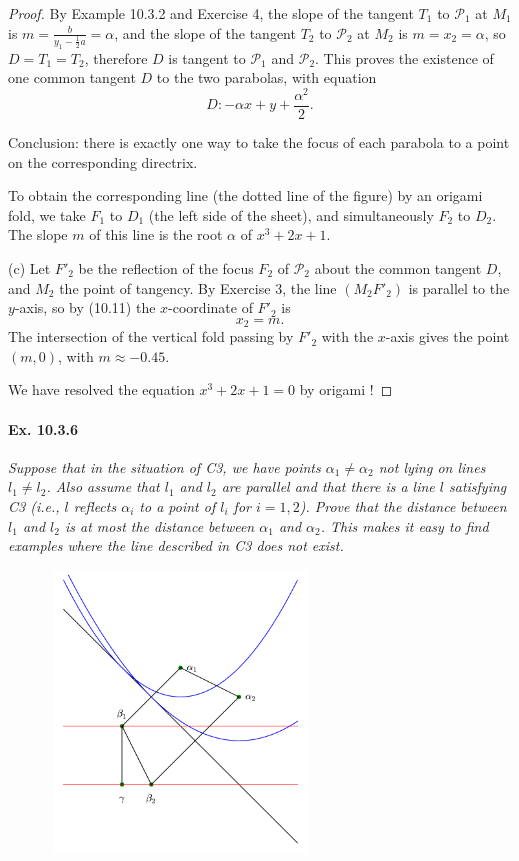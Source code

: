 \documentclass[11pt,a4paper]{article}
\begin{document}
\begin{proof}
By Example 10.3.2 and Exercise 4, the slope of the tangent $T_1$ to ${\mathscr P} _1$ at $M_1$ is $m = \frac{b}{y_1-\frac{1}{2}a} = \alpha$, and the slope of the tangent $T_2$ to ${\mathscr P} _2$ at $M_2$ is $m = x_2 = \alpha$, so $D = T_1 = T_2$, therefore $D$ is tangent to ${\mathscr P} _1$ and ${\mathscr P} _2$. This proves the existence of one common tangent $D$ to the two parabolas, with equation
$$D : -\alpha x + y +\frac{\alpha^2}{2}.$$

Conclusion: there is exactly one way to take the focus of each parabola to a point on the corresponding directrix.

To obtain the corresponding line (the dotted line of the figure) by an origami fold, we take $F_1$ to $D_1$ (the left side of the sheet), and simultaneously $F_2$ to $D_2$. The slope $m$ of this line is the root $\alpha$ of $x^3 + 2x +1$.


\item[(c)] Let $F'_2$ be the reflection of the focus $F_2$ of ${\mathscr P} _2$ about the common tangent $D$, and $M_2$ the point of tangency. By Exercise 3, the line $(M_2F'_2)$ is parallel to the $y$-axis, so by (10.11) the $x$-coordinate of $F'_2$ is $$x_2 =m.$$
 The intersection of the vertical fold  passing by $F'_2$ with the $x$-axis gives the point $(m,0)$, with $m\approx -0.45$. 
 
 We have resolved the equation $x^3 + 2x + 1 = 0$ by origami !
 
\end{proof}

\paragraph{Ex. 10.3.6}

{\it Suppose that in the situation of C3, we have points $\alpha_1\ne \alpha_2$ not lying on lines $l_1\ne l_2$. Also assume that $l_1$ and $l_2$ are parallel and that there is a line $l$ satisfying C3 (i.e., $l$ reflects $\alpha_i$ to a point of $l_i$ for $i=1,2$). Prove that the distance between $l_1$ and $l_2$ is at most the distance between $\alpha_1$ and $\alpha_2$. This makes it easy to find examples where the line described in C3 does not exist.
}

\begin{figure}[htbp]
\begin{center}
\includegraphics [width=7cm,height=7.5cm]  {parabolas0.pdf}
\end{center}
\end{figure}
\end{document}

